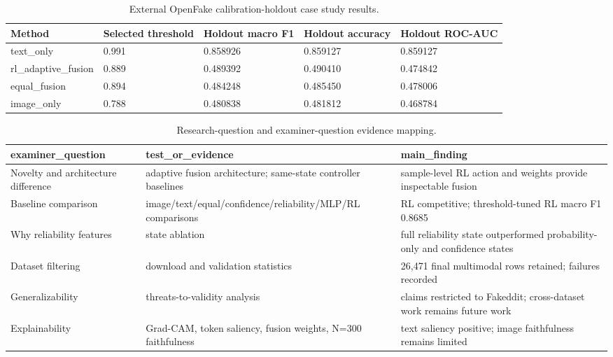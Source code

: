 \begin{table}[H]
\centering
\tiny
\caption{External OpenFake calibration-holdout case study results.}
\label{tab:external_openfake_calibration}
\begin{tabularx}{\textwidth}{YYYYY}
\toprule
Method & Selected threshold & Holdout macro F1 & Holdout accuracy & Holdout ROC-AUC \\
\midrule
text\_\allowbreak only & 0.991 & 0.858926 & 0.859127 & 0.859127 \\
rl\_\allowbreak adaptive\_\allowbreak fusion & 0.889 & 0.489392 & 0.490410 & 0.474842 \\
equal\_\allowbreak fusion & 0.894 & 0.484248 & 0.485450 & 0.478006 \\
image\_\allowbreak only & 0.788 & 0.480838 & 0.481812 & 0.468784 \\
\bottomrule
\end{tabularx}
\end{table}

\begin{table}[H]
\centering
\tiny
\caption{Research-question and examiner-question evidence mapping.}
\label{tab:research_question_evidence}
\begin{tabularx}{\textwidth}{YYY}
\toprule
examiner\_\allowbreak question & test\_\allowbreak or\_\allowbreak evidence & main\_\allowbreak finding \\
\midrule
Novelty and architecture difference & adaptive fusion architecture; same-state controller baselines & sample-level RL action and weights provide inspectable fusion \\
Baseline comparison & image/\allowbreak text/\allowbreak equal/\allowbreak confidence/\allowbreak reliability/\allowbreak MLP/\allowbreak RL comparisons & RL competitive; threshold-tuned RL macro F1 0.8685 \\
Why reliability features & state ablation & full reliability state outperformed probability-only and confidence states \\
Dataset filtering & download and validation statistics & 26,471 final multimodal rows retained; failures recorded \\
Generalizability & threats-to-validity analysis & claims restricted to Fakeddit; cross-dataset work remains future work \\
Explainability & Grad-CAM, token saliency, fusion weights, N=300 faithfulness & text saliency positive; image faithfulness remains limited \\
\bottomrule
\end{tabularx}
\end{table}

\clearpage
